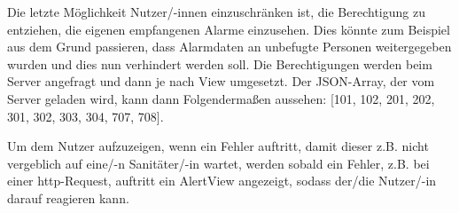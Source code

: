     Die letzte Möglichkeit Nutzer/-innen einzuschränken ist, die Berechtigung zu entziehen, 
    die eigenen empfangenen Alarme einzusehen. Dies könnte zum Beispiel aus dem Grund 
    passieren, dass Alarmdaten an unbefugte Personen weitergegeben wurden und dies nun 
    verhindert werden soll. Die Berechtigungen werden beim Server angefragt und dann je 
    nach View umgesetzt. Der JSON-Array, der vom Server geladen wird, kann dann 
    Folgendermaßen aussehen: [101, 102, 201, 202, 301, 302, 303, 304, 707, 708].

    Um dem Nutzer aufzuzeigen, wenn ein Fehler auftritt, damit dieser z.B. nicht vergeblich auf 
    eine/-n Sanitäter/-in wartet, werden sobald ein Fehler, z.B. bei einer http-Request, auftritt
    ein AlertView angezeigt, sodass der/die Nutzer/-in darauf reagieren kann. 